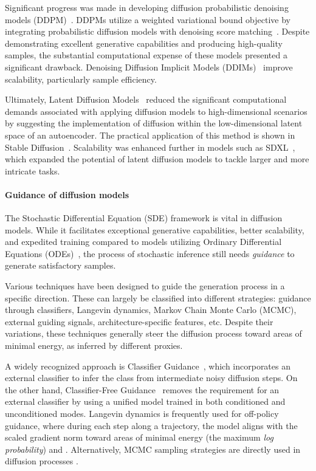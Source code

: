 Significant progress was made in developing diffusion probabilistic denoising models (DDPM)~\citep{ho2020denoising,dhariwal2021diffusion}. DDPMs utilize a weighted variational bound objective by integrating probabilistic diffusion models with denoising score matching~\citep{song2019generative}. Despite demonstrating excellent generative capabilities and producing high-quality samples, the substantial computational expense of these models presented a significant drawback. Denoising Diffusion Implicit Models (DDIMs)~\citep{song2020denoising} improve scalability, particularly sample efficiency.


Ultimately, Latent Diffusion Models~\citep{rombach2022high} reduced the significant computational demands associated with applying diffusion models to high-dimensional scenarios by suggesting the implementation of diffusion within the low-dimensional latent space of an autoencoder. The practical application of this method is shown in Stable Diffusion~\citep{rombach2022high}. Scalability was enhanced further in models such as SDXL~\citep{podell2023sdxl}, which expanded the potential of latent diffusion models to tackle larger and more intricate tasks.

\paragraph{Guidance of diffusion models}
The Stochastic Differential Equation (SDE) framework is vital in diffusion models. While it facilitates exceptional generative capabilities, better scalability, and expedited training compared to models utilizing Ordinary Differential Equations (ODEs)~\citep{dinh2014nice,rezende2015variational, grathwohl2018ffjord}, the process of stochastic inference still needs \textit{guidance} to generate satisfactory samples.

Various techniques have been designed to guide the generation process in a specific direction. These can largely be classified into different strategies: guidance through classifiers, Langevin dynamics, Markov Chain Monte Carlo (MCMC), external guiding signals, architecture-specific features, etc. Despite their variations, these techniques generally steer the diffusion process toward areas of minimal energy, as inferred by different proxies.



A widely recognized approach is Classifier Guidance~\citep{dhariwal2021diffusion,poleski2024geoguide}, which incorporates an external classifier to infer the class from intermediate noisy diffusion steps. On the other hand, Classifier-Free Guidance~\citep{ho2022classifier} removes the requirement for an external classifier by using a unified model trained in both conditioned and unconditioned modes. Langevin dynamics is frequently used for off-policy guidance, where during each step along a trajectory, the model aligns with the scaled gradient norm toward areas of minimal energy (the maximum \textit{log probability}) \cite{zhang2021path} and \cite{sendera2024diffusion}. Alternatively, MCMC sampling strategies are directly used in diffusion processes \citep{song2023loss,chung2023diffusion}.

